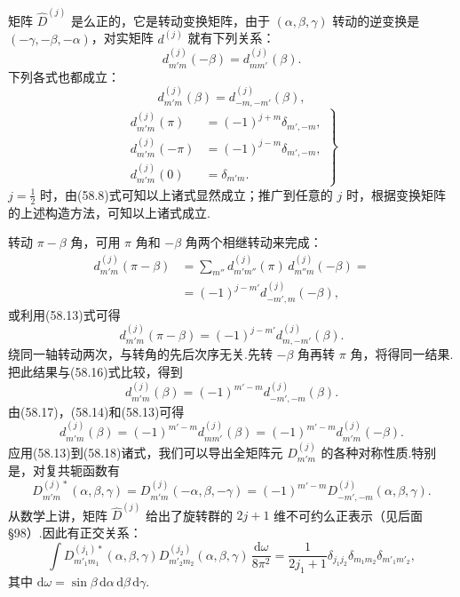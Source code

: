 矩阵 $\hat{D}^{(j)}$ 是么正的，它是转动变换矩阵，由于 $(\alpha,\beta,\gamma)$ 转动的逆变换是 $(-\gamma,-\beta,-\alpha)$，对实矩阵 $d^{(j)}$ 就有下列关系：
\begin{equation}
  d^{(j)}_{m'm}(-\beta)=d^{(j)}_{mm'}(\beta).
\end{equation}
下列各式也都成立：
\begin{equation}
  d^{(j)}_{m'm}(\beta)=d^{(j)}_{-m,-m'}(\beta),
\end{equation}
\begin{equation}
\left.\begin{aligned}
  d^{(j)}_{m'm}(\pi)&=(-1)^{j+m}\delta_{m',-m},\\
  d^{(j)}_{m'm}(-\pi)&=(-1)^{j-m}\delta_{m',-m},\\
  d^{(j)}_{m'm}(0)&=\delta_{m'm}.
\end{aligned}\right\}
\end{equation}
$j=\frac{1}{2}$ 时，由(58.8)式可知以上诸式显然成立；推广到任意的 $j$ 时，根据变换矩阵的上述构造方法，可知以上诸式成立.

转动 $\pi-\beta$ 角，可用 $\pi$ 角和 $-\beta$ 角两个相继转动来完成：
\begin{equation*}
\begin{aligned}
  d^{(j)}_{m'm}(\pi-\beta)
  &=\sum_{m''}d^{(j)}_{m'm''}(\pi)\,d^{(j)}_{m''m}(-\beta)=\\
  &=(-1)^{j-m'}d^{(j)}_{-m',m}(-\beta),
\end{aligned}
\end{equation*}
或利用(58.13)式可得
\begin{equation}
  d^{(j)}_{m'm}(\pi-\beta)=(-1)^{j-m'}d^{(j)}_{m,-m'}(\beta).
\end{equation}
绕同一轴转动两次，与转角的先后次序无关.先转 $-\beta$ 角再转 $\pi$ 角，将得同一结果.把此结果与(58.16)式比较，得到
\begin{equation}
  d^{(j)}_{m'm}(\beta)=(-1)^{m'-m}d^{(j)}_{-m',-m}(\beta).
\end{equation}
由(58.17)，(58.14)和(58.13)可得
\begin{equation}
  d^{(j)}_{m'm}(\beta)=(-1)^{m'-m}d^{(j)}_{mm'}(\beta)
  =(-1)^{m'-m}d^{(j)}_{m'm}(-\beta).
\end{equation}
应用(58.13)到(58.18)诸式，我们可以导出全矩阵元 $D^{(j)}_{m'm}$ 的各种对称性质.特别是，对复共轭函数有
\begin{equation}
  D^{(j)*}_{m'm}(\alpha,\beta,\gamma)=D^{(j)}_{m'm}(-\alpha,\beta,-\gamma)
  =(-1)^{m'-m}D^{(j)}_{-m',-m}(\alpha,\beta,\gamma).
\end{equation}
从数学上讲，矩阵 $\hat{D}^{(j)}$ 给出了旋转群的 $2j+1$ 维不可约么正表示（见后面§98）.因此有正交关系：
\begin{equation}
  \int D^{(j_1)*}_{m'_1m_1}(\alpha,\beta,\gamma)
  D^{(j_2)}_{m'_2m_2}(\alpha,\beta,\gamma)\,
  \frac{\mathrm{d}\omega}{8\pi^2}
  =\frac{1}{2j_1+1}\delta_{j_1j_2}\delta_{m_1m_2}\delta_{m'_1m'_2},
\end{equation}
其中 $\mathrm{d}\omega=\sin\beta\,\mathrm{d}\alpha\,\mathrm{d}\beta\,\mathrm{d}\gamma$.

